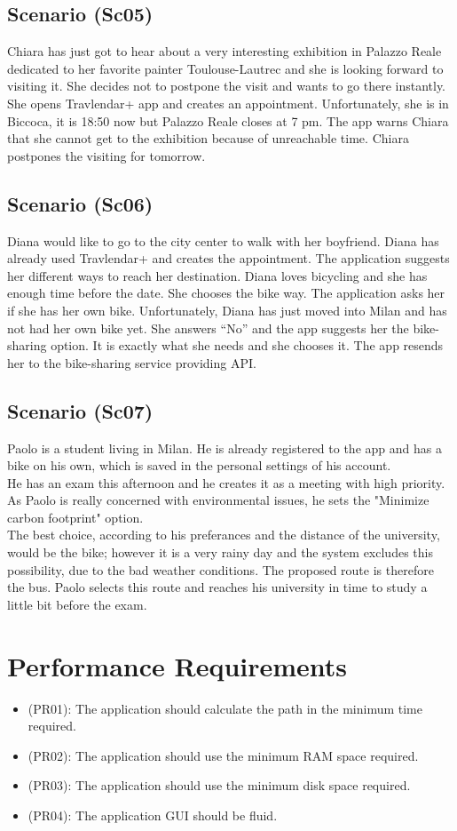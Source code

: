 \documentclass[a4paper,leqno]{book}
\begin{document}
\subsection{Scenario (Sc05)}
Chiara has just got to hear about a very interesting exhibition in Palazzo Reale dedicated to her favorite painter Toulouse-Lautrec and she is looking forward to visiting it. She decides not to postpone the visit and wants to go there instantly. She opens Travlendar+ app and creates an appointment. Unfortunately, she is in Biccoca, it is 18:50 now but Palazzo Reale closes at 7 pm.   The app warns Chiara that she cannot get to the exhibition because of unreachable time. Chiara postpones the visiting for tomorrow.

\subsection{Scenario (Sc06)}
Diana would like to go to the city center to walk with her boyfriend. Diana has already used Travlendar+ and creates the appointment. The application suggests her different ways to reach her destination. Diana loves bicycling and she has enough time before the date. She chooses the bike way. The application asks her if she has her own bike. Unfortunately, Diana has just moved into Milan and has not had her own bike yet. She answers “No” and the app suggests her the bike-sharing option. It is exactly what she needs and she chooses it. The app resends her to the bike-sharing service providing API. 

\subsection{Scenario (Sc07)}
Paolo is a student living in Milan. He is already registered to the app and has a bike on his own, which is saved in the personal settings of his account.\\
He has an exam this afternoon and he creates it as a meeting with high priority. As Paolo is really concerned with environmental issues, he sets the "Minimize carbon footprint" option.\\
The best choice, according to his preferances and the distance of the university, would be the bike; however it is a very rainy day and the system excludes this possibility, due to the bad weather conditions.
The proposed route is therefore the bus. Paolo selects this route and reaches his university in time to study a little bit before the exam.

\section{Performance Requirements}
\begin{itemize}
\item (PR01): The application should calculate the path in the minimum time required.
\item (PR02): The application should use the minimum RAM space required.
\item (PR03): The application should use the minimum disk space required.
\item (PR04): The application GUI should be fluid.
\end{itemize}
\end{document}
